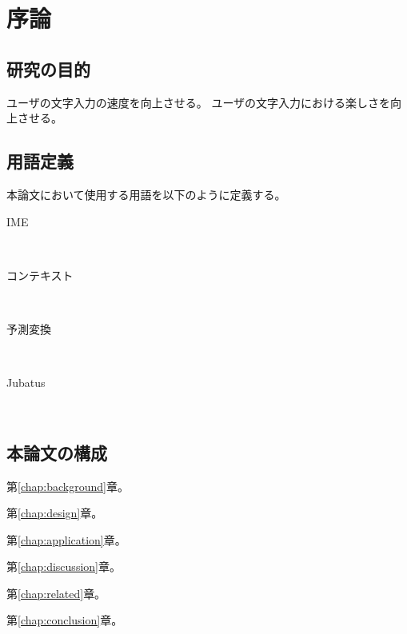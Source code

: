 \chapter{序論}
\label{chap:introduction}

\section{研究の目的}
ユーザの文字入力の速度を向上させる。
ユーザの文字入力における楽しさを向上させる。
\section{用語定義}

本論文において使用する用語を以下のように定義する。

\begin{description}
  \item [IME] \mbox{}\\
  \item [コンテキスト] \mbox{}\\
  \item [予測変換] \mbox{}\\
  \item [Jubatus] \mbox{}\\

\end{description}

\section{本論文の構成}


第\ref{chap:background}章。

第\ref{chap:design}章。

第\ref{chap:application}章。

第\ref{chap:discussion}章。

第\ref{chap:related}章。

第\ref{chap:conclusion}章。
